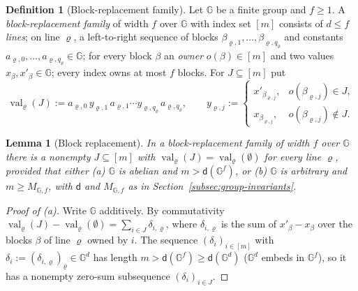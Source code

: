 \documentclass[11pt]{article}
\numberwithin{equation}{section}
\theoremstyle{plain}
\newtheorem{lemma}[theorem]{Lemma}
\theoremstyle{definition}
\newtheorem{definition}[theorem]{Definition}
\theoremstyle{remark}
\begin{document}
\begin{definition}[Block-replacement family]
\label{def:block-family}
Let ${\mathbb G}$ be a finite group and $f\ge1$.  A \emph{block-replacement family} of
width $f$ over ${\mathbb G}$ with index set $[m]$ consists of $d\le f$ \emph{lines}; on
line $\varrho$, a left-to-right sequence of blocks $\beta_{\varrho,1},\ldots,\beta_{\varrho,q_\varrho}$
and constants $a_{\varrho,0},\ldots,a_{\varrho,q_\varrho}\in {\mathbb G}$; for every block $\beta$ an
\emph{owner} $o(\beta)\in[m]$ and two values $x_\beta,x'_\beta\in {\mathbb G}$; every
index owns at most $f$ blocks.  For $J\subseteq[m]$ put
\[
 \operatorname{val}_\varrho(J):=a_{\varrho,0}\,y_{\varrho,1}\,a_{\varrho,1}\cdots y_{\varrho,q_\varrho}\,a_{\varrho,q_\varrho},
 \qquad
 y_{\varrho,j}:=
 \begin{cases}
 x'_{\beta_{\varrho,j}},& o(\beta_{\varrho,j})\in J,\\
 x_{\beta_{\varrho,j}},& o(\beta_{\varrho,j})\notin J.
 \end{cases}
\]
\end{definition}

\begin{lemma}[Block replacement]
\label{lem:block-replacement}
In a block-replacement family of width $f$ over ${\mathbb G}$ there is a nonempty
$J\subseteq[m]$ with $\operatorname{val}_\varrho(J)=\operatorname{val}_\varrho(\emptyset)$ for every
line $\varrho$, provided that either
\textup{(a)} ${\mathbb G}$ is abelian and $m>\mathsf d({\mathbb G}^f)$, or
\textup{(b)} ${\mathbb G}$ is arbitrary and $m\ge M_{{\mathbb G},f}$, with $\mathsf d$ and
$M_{{\mathbb G},f}$ as in Section~\ref{subsec:group-invariants}.
\end{lemma}

\begin{proof}[Proof of \textup{(a)}]
Write ${\mathbb G}$ additively.  By commutativity
$\operatorname{val}_\varrho(J)-\operatorname{val}_\varrho(\emptyset)=\sum_{i\in J}\delta_{i,\varrho}$, where
$\delta_{i,\varrho}$ is the sum of $x'_\beta-x_\beta$ over the blocks $\beta$ of line $\varrho$
owned by $i$.  The sequence $(\delta_i)_{i\in[m]}$ with $\delta_i:=(\delta_{i,\varrho})_\varrho\in {\mathbb G}^d$
has length $m>\mathsf d({\mathbb G}^f)\ge\mathsf d({\mathbb G}^d)$ (${\mathbb G}^d$ embeds in ${\mathbb G}^f$), so it has a
nonempty zero-sum subsequence $(\delta_i)_{i\in J}$.
\end{proof}
\end{document}
